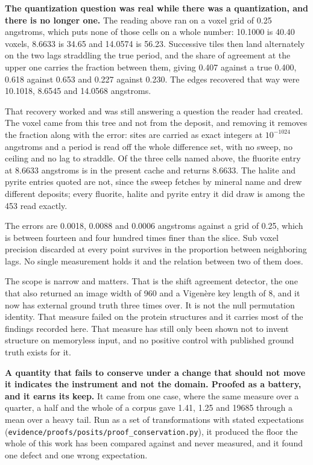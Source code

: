 \textbf{The quantization question was real while there was a quantization, and there is no longer one.} The reading above ran on a voxel grid of 0.25 angstroms, which puts none of those cells on a whole number: 10.1000 is 40.40 voxels, 8.6633 is 34.65 and 14.0574 is 56.23. Successive tiles then land alternately on the two lags straddling the true period, and the share of agreement at the upper one carries the fraction between them, giving 0.407 against a true 0.400, 0.618 against 0.653 and 0.227 against 0.230. The edges recovered that way were 10.1018, 8.6545 and 14.0568 angstroms.

That recovery worked and was still answering a question the reader had created. The voxel came from this tree and not from the deposit, and removing it removes the fraction along with the error: sites are carried as exact integers at \(10^{-1024}\) angstroms and a period is read off the whole difference set, with no sweep, no ceiling and no lag to straddle. Of the three cells named above, the fluorite entry at 8.6633 angstroms is in the present cache and returns 8.6633. The halite and pyrite entries quoted are not, since the sweep fetches by mineral name and drew different deposits; every fluorite, halite and pyrite entry it did draw is among the 453 read exactly.

The errors are 0.0018, 0.0088 and 0.0006 angstroms against a grid of 0.25, which is between fourteen and four hundred times finer than the slice. Sub voxel precision discarded at every point survives in the proportion between neighboring lags. No single measurement holds it and the relation between two of them does.

The scope is narrow and matters. That is the shift agreement detector, the one that also returned an image width of 960 and a Vigenère key length of 8, and it now has external ground truth three times over. It is not the null permutation identity. That measure failed on the protein structures and it carries most of the findings recorded here. That measure has still only been shown not to invent structure on memoryless input, and no positive control with published ground truth exists for it.

\textbf{A quantity that fails to conserve under a change that should not move it indicates the instrument and not the domain. Proofed as a battery, and it earns its keep.} It came from one case, where the same measure over a quarter, a half and the whole of a corpus gave 1.41, 1.25 and 19685 through a mean over a heavy tail. Run as a set of transformations with stated expectations (\texttt{evidence/\allowbreak{}proofs/\allowbreak{}posits/\allowbreak{}proof\_\allowbreak{}conservation.\allowbreak{}py}), it produced the floor the whole of this work has been compared against and never measured, and it found one defect and one wrong expectation.

